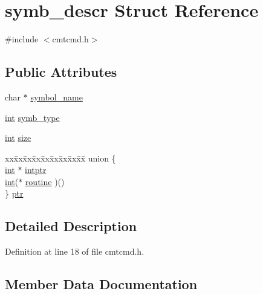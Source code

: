 \hypertarget{structsymb__descr}{}\section{symb\+\_\+descr Struct Reference}
\label{structsymb__descr}


{\ttfamily \#include $<$cmtcmd.\+h$>$}

\subsection*{Public Attributes}
\begin{DoxyCompactItemize}
\item 
char $\ast$ \hyperlink{structsymb__descr_a10ff43137b67790330f9d2526d38744f}{symbol\+\_\+name}
\item 
\hyperlink{xmltok_8h_a5a0d4a5641ce434f1d23533f2b2e6653}{int} \hyperlink{structsymb__descr_a80ff5ad23246fee7a7b79d95d1ef9060}{symb\+\_\+type}
\item 
\hyperlink{xmltok_8h_a5a0d4a5641ce434f1d23533f2b2e6653}{int} \hyperlink{structsymb__descr_a05dbf47e93c973eb1c57e6839270b40b}{size}
\item 
\begin{tabbing}
xx\=xx\=xx\=xx\=xx\=xx\=xx\=xx\=xx\=\kill
union \{\\
\>\hyperlink{xmltok_8h_a5a0d4a5641ce434f1d23533f2b2e6653}{int} $\ast$ \hyperlink{structsymb__descr_aaff5c0c3bb9701f2605fd1820e76cb17}{intptr}\\
\>\hyperlink{xmltok_8h_a5a0d4a5641ce434f1d23533f2b2e6653}{int}($\ast$ \hyperlink{structsymb__descr_a4c8cf5138321d2ba066a5352109ba785}{routine} )()\\
\} \hyperlink{structsymb__descr_ae3740fba2c610bdb8d7ed30c6041d883}{ptr}\\

\end{tabbing}\end{DoxyCompactItemize}


\subsection{Detailed Description}


Definition at line 18 of file cmtcmd.\+h.



\subsection{Member Data Documentation}
